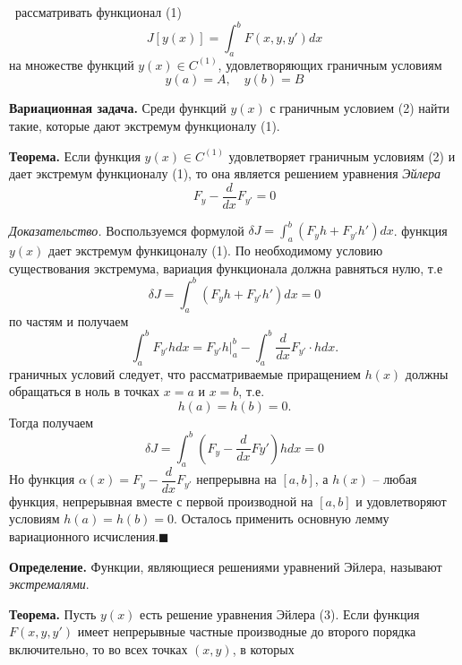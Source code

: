 \documentclass[9pt]{article}
\begin{document}
\ 
 рассматривать функционал (1)
\begin{equation}
    J[y(x)]=\int^b_aF(x,y,y')dx
\end{equation}
на множестве функций \(y(x)\in C^{(1)}\), удовлетворяющих граничным условиям
\begin{equation}
    y(a)=A,\quad y(b) = B
\end{equation}
\par\textbf{Вариационная задача.} Среди функций \(y(x)\) с граничным условием (2) найти такие, которые дают экстремум функционалу (1).
\par\textbf{Теорема.} Если функция \(y(x)\in C^{(1)}\) удовлетворяет граничным условиям (2) и дает экстремум функционалу (1), то она является решением уравнения \textit{Эйлера}
\begin{equation}
    F_y-\dfrac{d}{dx}F_{y'}=0
\end{equation}
\par\textit{Доказательство.} Воспользуемся формулой \(\delta J=\displaystyle\int_a^b(F_yh+F_{y'}h')dx\).
\parПусть функция \(y(x)\) дает экстремум функицоналу (1). По необходимому условию существования экстремума, вариация функционала должна равняться нулю, т.е
\begin{equation*}
    \delta J=\int_a^b(F_yh+F_{y'}h')dx=0
\end{equation*}
 по частям и получаем
\begin{equation*}
    \int_a^bF_{y'}hdx=F_{y'}h|_a^b-\int^b_a\dfrac{d}{dx}F_{y'}\cdot hdx.
\end{equation*}
 граничных условий следует, что рассматриваемые приращением \(h(x)\) должны обращаться в ноль в точках \(x=a\) и \(x=b\), т.е.
\begin{equation}
    h(a)=h(b)=0.
\end{equation}
Тогда получаем
\begin{equation*}
    \delta J=\int_a^b(F_y-\dfrac{d}{dx}F{y'})hdx=0
\end{equation*}
Но функция \(\alpha(x)=F_y-\dfrac{d}{dx}F_{y'}\) непрерывна на \([a,b]\), а \(h(x)\) -- любая функция, непрерывная вместе с первой производной на \([a,b]\) и удовлетворяют условиям \(h(a)=h(b)=0\). Осталось применить основную лемму вариационного исчисления.\(\blacksquare\)
\par\textbf{Определение.} Функции, являющиеся решениями уравнений Эйлера, называют \textit{экстремалями}.
\par\textbf{Теорема.} Пусть \(y(x)\) есть решение уравнения Эйлера (3). Если функция \(F(x,y,y')\) имеет непрерывные частные производные до второго порядка включительно, то во всех точках \((x,y)\), в которых 
\end{document}
